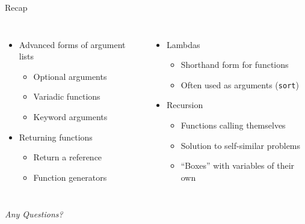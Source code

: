 
\begin{frame}[t,plain]
\titlepage
\end{frame}


\begin{frame}{Recap}
%
\begin{columns}[T]
\begin{itemize}
\item Advanced forms of argument lists
	\begin{itemize}
	\item Optional arguments
	\item Variadic functions
	\item Keyword arguments
	\end{itemize}
\item Returning functions
	\begin{itemize}
	\item Return a reference
	\item Function generators
	\end{itemize}
\end{itemize}
%
\begin{itemize}
\item Lambdas
	\begin{itemize}
	\item Shorthand form for functions
	\item Often used as arguments (\thus \texttt{sort})
	\end{itemize}
\item Recursion
	\begin{itemize}
	\item Functions calling themselves
	\item Solution to self-similar problems
	\item \enquote{Boxes} with variables of their own
	\end{itemize}
\end{itemize}

\end{columns}
%
\begin{center}
	\emph{Any Questions?}
\end{center}
%
\end{frame}


